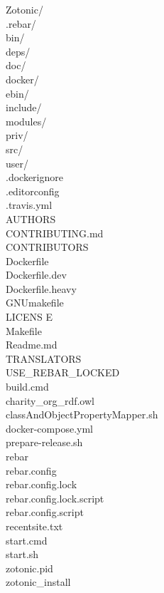 	\begin{tabbing}
		\qquad Zotonic/ \\
		\qquad \qquad .rebar/ \\
		\qquad \qquad bin/ \\
		\qquad \qquad deps/ \\
		\qquad \qquad doc/ \\
		\qquad \qquad docker/ \\
		\qquad \qquad ebin/ \\
		\qquad \qquad include/ \\
		\qquad \qquad modules/ \\
		\qquad \qquad priv/ \\
		\qquad \qquad src/ \\
		\qquad \qquad user/ \\
		\qquad \qquad .dockerignore \\
		\qquad \qquad .editorconfig \\
		\qquad \qquad .travis.yml \\
		\qquad \qquad AUTHORS \\
		\qquad \qquad CONTRIBUTING.md \\
		\qquad \qquad CONTRIBUTORS \\
		\qquad \qquad Dockerfile \\
		\qquad \qquad Dockerfile.dev \\
		\qquad \qquad Dockerfile.heavy \\
		\qquad \qquad GNUmakefile \\
		\qquad \qquad LICENS E\\
		\qquad \qquad Makefile \\
		\qquad \qquad Readme.md \\
		\qquad \qquad TRANSLATORS \\
		\qquad \qquad USE\_REBAR\_LOCKED \\
		\qquad \qquad build.cmd \\
		\qquad \qquad charity\_org\_rdf.owl \\
		\qquad \qquad classAndObjectPropertyMapper.sh \\
		\qquad \qquad docker-compose.yml \\
		\qquad \qquad prepare-release.sh \\
		\qquad \qquad rebar \\
		\qquad \qquad rebar.config\\
		\qquad \qquad rebar.config.lock\\
		\qquad \qquad rebar.config.lock.script\\
		\qquad \qquad rebar.config.script\\
		\qquad \qquad recentsite.txt\\
		\qquad \qquad start.cmd\\
		\qquad \qquad start.sh\\
		\qquad \qquad zotonic.pid\\
		\qquad \qquad zotonic\_install
	\end{tabbing}
	
